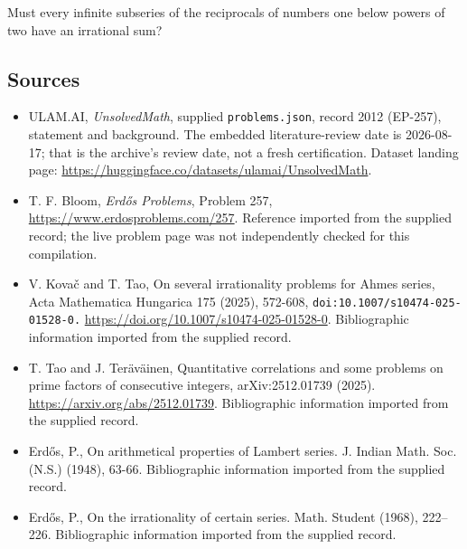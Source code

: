 \documentclass[11pt,a4paper]{article}
\begin{document}
Must every infinite subseries of the reciprocals of numbers one below powers of two have an irrational sum?

\subsection{Sources}

{\small

\begin{itemize}

\item[\hypertarget{source:2012:1}{S1}] ULAM.AI, \emph{UnsolvedMath}, supplied \texttt{problems.json}, record 2012 (EP-257), statement and background. The embedded literature-review date is 2026-08-17; that is the archive’s review date, not a fresh certification. Dataset landing page: \url{https://huggingface.co/datasets/ulamai/UnsolvedMath}.

\item[\hypertarget{source:2012:2}{S2}] T. F. Bloom, \emph{Erdős Problems}, Problem 257, \url{https://www.erdosproblems.com/257}. Reference imported from the supplied record; the live problem page was not independently checked for this compilation.

\item[\hypertarget{source:2012:3}{S3}] V. Kovač and T. Tao, On several irrationality problems for Ahmes series, Acta Mathematica Hungarica 175 (2025), 572-608, \nolinkurl{doi:10.1007/s10474-025-01528-0.} \url{https://doi.org/10.1007/s10474-025-01528-0}. Bibliographic information imported from the supplied record.

\item[\hypertarget{source:2012:4}{S4}] T. Tao and J. Teräväinen, Quantitative correlations and some problems on prime factors of consecutive integers, arXiv:2512.01739 (2025). \url{https://arxiv.org/abs/2512.01739}. Bibliographic information imported from the supplied record.

\item[\hypertarget{source:2012:5}{S5}] Erd\H{o}s, P., On arithmetical properties of Lambert series. J. Indian Math. Soc. (N.S.) (1948), 63-66. Bibliographic information imported from the supplied record.

\item[\hypertarget{source:2012:6}{S6}] Erd\H{o}s, P., On the irrationality of certain series. Math. Student (1968), 222--226. Bibliographic information imported from the supplied record.

\end{itemize}

}

\label{end:2012}
\end{document}
